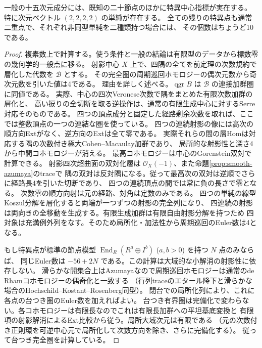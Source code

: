 \begin{proposition}\label{prop:extra-central-singular-characters}
一般の十五次元成分には、既知の二十節点のほかに特異中心指標が実在する。
特に次元ベクトル $(2,2,2,2)$ の単純が存在する。
全ての残りの特異点も通常二重点で、それぞれ非同型単純を二種類持つ場合には、
その個数はちょうど10である。
\end{proposition}
\begin{proof}
複素数上で計算する。使う条件と一般の結論は有限型のデータから標数零の幾何学的一般点に移る。
射影中心 $X$ 上で、四隅の全てを前定理の次数規約で層化した代数を $\mathcal B$ とする。
その完全圏の周期巡回ホモロジーの偶次元数から奇次元数を引いた値は4である。
理由を詳しく述べる。$\operatorname{qgr} B$ は $\mathcal B$ の連接加群圏に同値である。
実際、中心の四次Veronese次数で隅をまとめた有限次数加群の層化と、
高い捩りの全切断を取る逆操作は、通常の有限生成中心に対するSerre対応そのものである。
四つの頂点成分と固定した経路剰余次数を取れば、ここでは整数頂点の一つの連結な圏を使っている。
四つの連続射影の像には高次の順方向Extがなく、逆方向のExtは全て零である。
実際それらの間の層Homは対応する隅の次数付き極大Cohen--Macaulay加群であり、
局所的な射影性と深さ4から中間コホモロジーが消える。
最高コホモロジーは中心のGorenstein双対で計算できる。
射影四次超曲面の双対化層は $\mathcal O_X(-1)$、また命題\ref{prop:smooth-azumaya}のtraceで
隅の双対は反対隅になる。従って最高次の双対は逆順でさらに経路長4を引いた切断であり、
四つの連続頂点の間では常に負の長さで零となる。
次数零の順方向射は元の経路、対角は定数のみである。
四つの単純の線型Koszul分解を層化すると両端が一つずつの射影の完全列になり、
四連続の射影は両向きの全移動を生成する。有限生成加群は有限自由射影分解を持つため
四対象は充満例外列をなす。そのため局所化・加法性から周期巡回のEuler数は4となる。

もし特異点が標準の節点模型
$\operatorname{End}_R(R^a\oplus I^b)$ ($a,b>0$) を持つ $N$ 点のみならば、
同じEuler数は $-56+2N$ である。この計算は大域的な小解消の射影性に依存しない。
滑らかな開集合上はAzumayaなので周期巡回ホモロジーは通常のde Rhamコホモロジーの偶奇化と一致する
（行列traceのエタール降下と滑らかな場合のHochschild--Kostant--Rosenberg同型）。
閉台での局所化列により、これに各点の台つき圏のEuler数を加えればよい。
台つき有界圏は完備化で変わらない。各コホモロジーは有限長なのでこれは有限長加群への平坦基底変換と
有限項の射影解消によるExt比較から従う。局所大域次元は有限である
（元の次数付き正則環を可逆中心元で局所化して次数方向を除き、さらに完備化する）。
従って台つき完全圏を計算している。


\end{proof}
